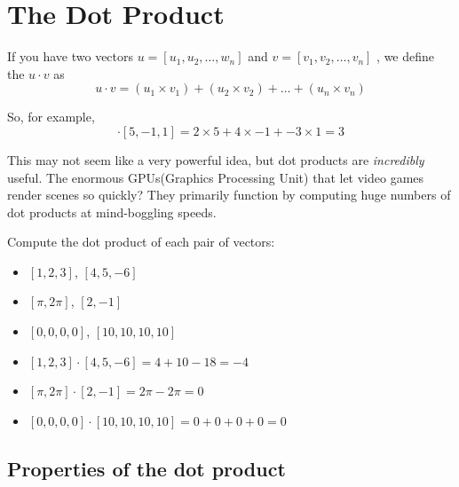 \chapter{The Dot Product}

If you have two vectors $u = [u_1, u_2, \dots, w_n]$ and $v = [v_1, v_2,\dots, v_n]$ , 
we define the  $u \cdot v$ as 
\begin{equation*}
     u \cdot v = (u_1 \times v_1) + (u_2 \times v_2) + \dots + (u_n \times v_n)
\end{equation*} 

So, for example, 
\begin{equation*}
    [2,4, -3] \cdot [5, -1, 1] = 2 \times 5 + 4 \times -1 + -3 \times 1 = 3
\end{equation*}

This may not seem like a very powerful idea, but dot products are \emph{incredibly} useful. 
The enormous GPUs(Graphics Processing Unit) that let video games render scenes so quickly? 
They primarily function by computing huge numbers of dot products at mind-boggling speeds. 

\begin{Exercise}[title={Basic dot products}, label=dot_products]
    Compute the dot product of each pair of vectors:
    \begin{itemize}
        \item $[1, 2, 3]$, $[4, 5, -6]$
        \item $[\pi, 2\pi]$, $[2, -1]$
        \item $[0,0,0,0]$, $[10,10,10,10]$
    \end{itemize}
\end{Exercise}
\begin{Answer}[ref=dot_products]
        \begin{itemize}
            \item $[1, 2, 3] \cdot [4, 5, -6] = 4 + 10 - 18 = -4$
            \item $[\pi, 2\pi] \cdot [2, -1] = 2\pi - 2\pi = 0$
            \item $[0,0,0,0] \cdot [10,10,10,10] = 0 + 0 + 0 + 0 = 0$ 
        \end{itemize}
\end{Answer}

\section{Properties of the dot product}

